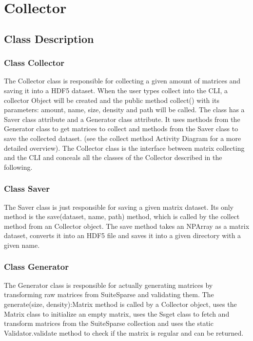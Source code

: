 \documentclass[parskip=full]{scrartcl}
\begin{document}
\section{Collector}

\subsection{Class Description}

\subsubsection{Class Collector}
The Collector class is responsible for collecting a given amount of matrices and saving it into a HDF5 dataset.
When the user types collect into the CLI, a collector Object will be created and the public method collect() with its parameters:
amount, name, size, density and path will be called. The class has a Saver class attribute and a Generator class attribute.
It uses methods from the Generator class to get matrices to collect and methods from the Saver class to save the collected dataset.
(see the collect method Activity Diagram for a more detailed overview).
The Collector class is the interface between matrix collecting and the CLI and conceals all the classes of the Collector described in the following.

\subsubsection{Class Saver}
The Saver class is just responsible for saving a given matrix dataset.
Its only method is the save(dataset, name, path) method, which
is called by the collect method from an Collector object.
The save method takes an NPArray as a matrix dataset, converts it into an HDF5 file and saves it into a given directory with a given name.

\subsubsection{Class Generator}
The Generator class is responsible for actually generating matrices by transforming raw matrices from SuiteSparse and validating them.
The generate(size, density):Matrix method is called by a Collector object, uses the Matrix class to initialize an empty matrix, uses the Ssget class to fetch and transform matrices from the SuiteSparse collection and uses the static Validator.validate method to check if the matrix is regular and can be returned.
\end{document}
